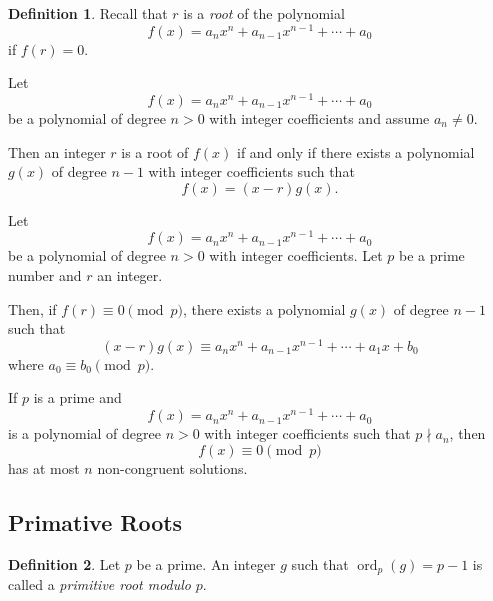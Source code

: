 \documentclass{article}
\theoremstyle{definition}
\newtheorem{definition}{Definition}
\newenvironment{manualtheorem}[1]{%
  \renewcommand{\thetheorem}{#1}%
  \theorem%
}{%
  \endtheorem%
}
\begin{document}
\begin{definition}
	Recall that $r$ is a \emph{root} of the polynomial
	\[
		f(x) = a_n x^n + a_{n-1} x^{n-1} + \cdots + a_0
	\]
	if $f(r) = 0$.
\end{definition}

\begin{manualtheorem}{6.1}
	Let
	\[
		f(x) = a_n x^n + a_{n-1} x^{n-1} + \cdots + a_0
	\]
	be a polynomial of degree $n > 0$ with integer coefficients and assume $a_n \neq 0$.

	Then an integer $r$ is a root of $f(x)$ if and only if there exists a polynomial $g(x)$ of degree $n - 1$ with integer coefficients such that
	\[
		f(x) = (x - r)g(x).
	\]
\end{manualtheorem}

\begin{manualtheorem}{6.2}
	Let
	\[
		f(x) = a_n x^n + a_{n-1} x^{n-1} + \cdots + a_0
	\]
	be a polynomial of degree $n > 0$ with integer coefficients. Let $p$ be a prime number and $r$ an integer.

	Then, if $f(r) \equiv 0 \pmod{p}$, there exists a polynomial $g(x)$ of degree $n - 1$ such that
	\[
		(x - r)g(x) \equiv a_n x^n + a_{n-1} x^{n-1} + \cdots + a_1 x + b_0
	\]
	where $a_0 \equiv b_0 \pmod{p}$.
\end{manualtheorem}

\begin{manualtheorem}{6.3}[Lagrange's Theorem]
	If $p$ is a prime and
	\[
		f(x) = a_n x^n + a_{n-1} x^{n-1} + \cdots + a_0
	\]
	is a polynomial of degree $n > 0$ with integer coefficients such that $p \nmid a_n$, then
	\[
		f(x) \equiv 0 \pmod{p}
	\]
	has at most $n$ non-congruent solutions.
\end{manualtheorem}

\subsection{Primative Roots}

\begin{definition}
	Let $p$ be a prime. An integer $g$ such that $\operatorname{ord}_p(g) = p - 1$ is called a \emph{primitive root modulo} $p$.
\end{definition}
\end{document}

